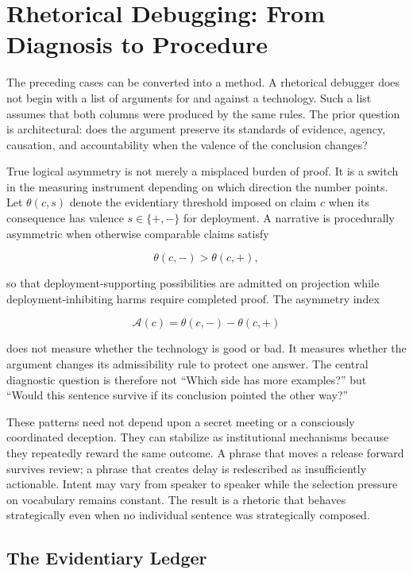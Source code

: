 \documentclass[11pt]{article}
\begin{document}
\section{Rhetorical Debugging: From Diagnosis to Procedure}

The preceding cases can be converted into a method. A rhetorical debugger does not begin with a list of arguments for and against a technology. Such a list assumes that both columns were produced by the same rules. The prior question is architectural: does the argument preserve its standards of evidence, agency, causation, and accountability when the valence of the conclusion changes?

True logical asymmetry is not merely a misplaced burden of proof. It is a switch in the measuring instrument depending on which direction the number points. Let \(\theta(c,s)\) denote the evidentiary threshold imposed on claim \(c\) when its consequence has valence \(s\in\{+,-\}\) for deployment. A narrative is procedurally asymmetric when otherwise comparable claims satisfy

\[
  \theta(c,-) > \theta(c,+),
\]

so that deployment-supporting possibilities are admitted on projection while deployment-inhibiting harms require completed proof. The asymmetry index

\[
  \mathcal A(c)=\theta(c,-)-\theta(c,+)
\]

does not measure whether the technology is good or bad. It measures whether the argument changes its admissibility rule to protect one answer. The central diagnostic question is therefore not \enquote{Which side has more examples?} but \enquote{Would this sentence survive if its conclusion pointed the other way?}

These patterns need not depend upon a secret meeting or a consciously coordinated deception. They can stabilize as institutional mechanisms because they repeatedly reward the same outcome. A phrase that moves a release forward survives review; a phrase that creates delay is redescribed as insufficiently actionable. Intent may vary from speaker to speaker while the selection pressure on vocabulary remains constant. The result is a rhetoric that behaves strategically even when no individual sentence was strategically composed.

\subsection{The Evidentiary Ledger}
\end{document}
